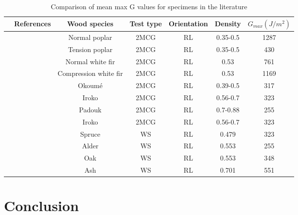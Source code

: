 \begin{table} \centering
	\begin{tabular}{ccccccc}
		\toprule %
		& References & Wood species & Test type & Orientation & Density & $G_{max}(J/m^2)$\\\midrule
		& \cite{Mambili2018} & Normal poplar & 2MCG & RL & 0.35-0.5 & 1287\\\midrule
		& \cite{Mambili2018} & Tension poplar & 2MCG & RL & 0.35-0.5 & 430\\\midrule
		& \cite{Mambili2018} & Normal white fir & 2MCG & RL & 0.53 & 761\\\midrule
		& \cite{Mambili2018} & Compression white fir & 2MCG & RL  & 0.53 & 1169\\\midrule
		& \cite{Odounga2018phd} & Okoumé & 2MCG & RL & 0.39-0.5 & 317\\\midrule
		& \cite{Odounga2018phd} & Iroko & 2MCG & RL & 0.56-0.7 & 323\\\midrule
		& \cite{Odounga2018phd} & Padouk & 2MCG & RL & 0.7-0.88 & 255\\\midrule
		& \cite{Odounga2018phd} & Iroko & 2MCG & RL & 0.56-0.7 & 323\\\midrule
		& \cite{Reiterer2002} & Spruce & WS & RL & 0.479 & 323\\\midrule
		& \cite{Reiterer2002} & Alder & WS & RL & 0.553 & 255\\\midrule
		& \cite{Reiterer2002} & Oak & WS & RL & 0.553 & 348\\\midrule
		& \cite{Reiterer2002} & Ash & WS & RL & 0.701 & 551\\
		\bottomrule %
	\end{tabular}
	\caption{Comparison of mean max G values for specimens in the literature}
	\label{fig:fig37}
\end{table}

\section{Conclusion}